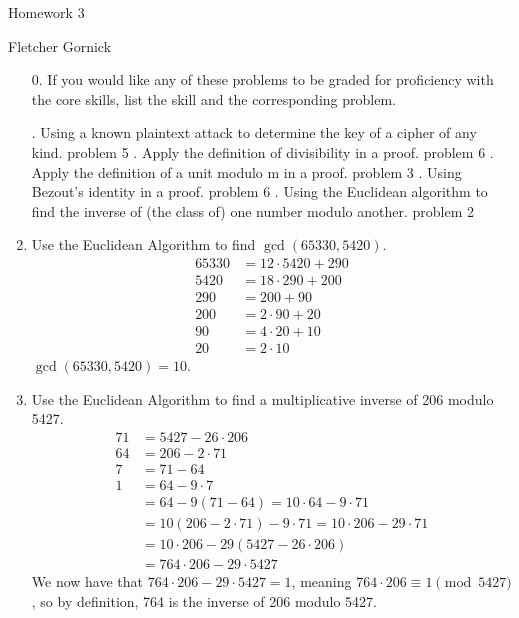 \documentclass[11pt]{article}
\newcommand{\n}{\vspace{0.5cm}}
\begin{document}
  \begin{center}
    {\Large Homework 3} \n

    Fletcher Gornick
  \end{center}

  \begin{enumerate}
    \item[0.] If you would like any of these problems to be graded for proficiency with the core skills, list the skill and the corresponding problem.
      \begin{outline}
        . Using a known plaintext attack to determine the key of a cipher of any kind.
          \2 problem 5
        . Apply the definition of divisibility in a proof.
          \2 problem 6
        . Apply the definition of a unit modulo m in a proof.
          \2 problem 3
        . Using Bezout’s identity in a proof.
          \2 problem 6
        . Using the Euclidean algorithm to find the inverse of (the class of) one number modulo another.
          \2 problem 2
      \end{outline} \n

    \item Use the Euclidean Algorithm to find \(\gcd(65330,5420)\).
      \begin{align*}
        65330 &= 12 \cdot 5420 + 290 \\
        5420  &= 18 \cdot 290 + 200 \\
        290   &= 200 + 90 \\
        200   &= 2 \cdot 90 + 20 \\
        90    &= 4 \cdot 20 + 10 \\
        20    &= 2 \cdot 10
      \end{align*}
      \(\gcd(65330,5420) = 10\).

    \item Use the Euclidean Algorithm to find a multiplicative inverse of 206 modulo 5427.
      \begin{align*}
        71 &= 5427 - 26 \cdot 206 \\
        64 &= 206 - 2 \cdot 71 \\
        7  &= 71 - 64 \\
        1  &= 64 - 9 \cdot 7 \\
           &= 64 - 9(71 - 64) = 10 \cdot 64 - 9 \cdot 71 \\
           &= 10(206 - 2 \cdot 71) - 9 \cdot 71 = 10 \cdot 206 - 29 \cdot 71 \\
           &= 10 \cdot 206 - 29(5427 - 26 \cdot 206) \\
           &= 764 \cdot 206 - 29 \cdot 5427
      \end{align*}
      We now have that \(764 \cdot 206 - 29 \cdot 5427 = 1\), meaning \(764 \cdot 206 \equiv 1 \pmod{5427}\), so by definition, 764 is the inverse of 206 modulo 5427.


\end{enumerate}
\end{document}
